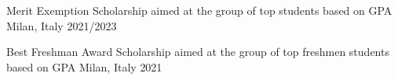 



\begin{cvhonors}

  \cvhonor
  {Merit Exemption} %
  {Scholarship aimed at the group of top students based on GPA} %
  {Milan, Italy} %
  {2021/2023} %

  \cvhonor
  {Best Freshman Award} %
  {Scholarship aimed at the group of top freshmen students based on GPA} %
  {Milan, Italy} %
  {2021} %

\end{cvhonors}
